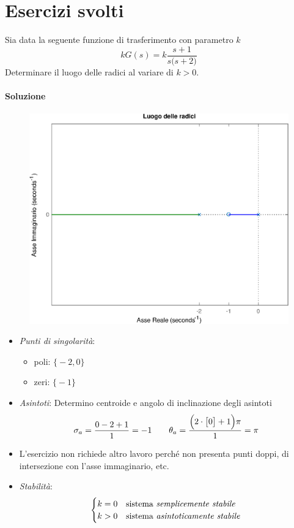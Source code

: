 \section{Esercizi svolti}
\begin{esercizio}
Sia data la seguente funzione di trasferimento con parametro \(k\)
\[
	kG(s) = k \frac{s+1}{s \bigl( s+2 \bigr)}
\]
Determinare il luogo delle radici al variare di \(k > 0\).

\paragraph{Soluzione}

\begin{figure}[ht]
	\centering
	\includegraphics[scale=.6]{mod1/assets/rl_ex31}
\end{figure}

\begin{itemize}
	\item \emph{Punti di singolarità}:
		\begin{itemize}
			\item poli: \(\bigl\{-2, 0\bigr\}\)
			\item zeri: \(\bigl\{-1\bigr\}\)
		\end{itemize}
	\item \emph{Asintoti}:
		Determino centroide e angolo di inclinazione degli asintoti
		\[
			\sigma_a = \frac{0 -2 +1}{1} = -1
			\qquad
			\theta_a = \frac{\Bigl(2\cdot\bigl[0\bigr]+1\Bigr)\pi}{1} = \pi
		\]
	\item L'esercizio non richiede altro lavoro perché non presenta punti doppi,
		di intersezione con l'asse immaginario, etc.
	\item \emph{Stabilità}:
		\[\begin{cases}
			k = 0 & \text{sistema \emph{semplicemente stabile}} \\
			k > 0 & \text{sistema \emph{asintoticamente stabile}} \\
		\end{cases}\]
\end{itemize}
\end{esercizio}

